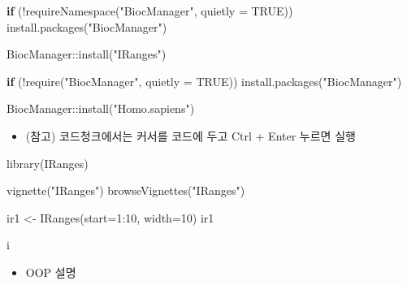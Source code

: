 \documentclass[
]{book}
\newenvironment{Shaded}{\begin{snugshade}}{\end{snugshade}}
\newcommand{\AttributeTok}[1]{\textcolor[rgb]{0.77,0.63,0.00}{#1}}
\newcommand{\ConstantTok}[1]{\textcolor[rgb]{0.00,0.00,0.00}{#1}}
\newcommand{\ControlFlowTok}[1]{\textcolor[rgb]{0.13,0.29,0.53}{\textbf{#1}}}
\newcommand{\DecValTok}[1]{\textcolor[rgb]{0.00,0.00,0.81}{#1}}
\newcommand{\FunctionTok}[1]{\textcolor[rgb]{0.00,0.00,0.00}{#1}}
\newcommand{\NormalTok}[1]{#1}
\newcommand{\OtherTok}[1]{\textcolor[rgb]{0.56,0.35,0.01}{#1}}
\newcommand{\SpecialCharTok}[1]{\textcolor[rgb]{0.00,0.00,0.00}{#1}}
\newcommand{\StringTok}[1]{\textcolor[rgb]{0.31,0.60,0.02}{#1}}
\providecommand{\tightlist}{%
  \setlength{\itemsep}{0pt}\setlength{\parskip}{0pt}}
\begin{document}
\begin{Shaded}
\begin{Highlighting}[]
\ControlFlowTok{if}\NormalTok{ (}\SpecialCharTok{!}\FunctionTok{requireNamespace}\NormalTok{(}\StringTok{"BiocManager"}\NormalTok{, }\AttributeTok{quietly =} \ConstantTok{TRUE}\NormalTok{))}
    \FunctionTok{install.packages}\NormalTok{(}\StringTok{"BiocManager"}\NormalTok{)}

\NormalTok{BiocManager}\SpecialCharTok{::}\FunctionTok{install}\NormalTok{(}\StringTok{"IRanges"}\NormalTok{)}
\end{Highlighting}
\end{Shaded}

\begin{Shaded}
\begin{Highlighting}[]
\ControlFlowTok{if}\NormalTok{ (}\SpecialCharTok{!}\FunctionTok{require}\NormalTok{(}\StringTok{"BiocManager"}\NormalTok{, }\AttributeTok{quietly =} \ConstantTok{TRUE}\NormalTok{))}
    \FunctionTok{install.packages}\NormalTok{(}\StringTok{"BiocManager"}\NormalTok{)}

\NormalTok{BiocManager}\SpecialCharTok{::}\FunctionTok{install}\NormalTok{(}\StringTok{"Homo.sapiens"}\NormalTok{)}
\end{Highlighting}
\end{Shaded}

\begin{itemize}
\tightlist
\item
  (참고) 코드청크에서는 커서를 코드에 두고 Ctrl + Enter 누르면 실행
\end{itemize}

\begin{Shaded}
\begin{Highlighting}[]
\FunctionTok{library}\NormalTok{(IRanges)}

\FunctionTok{vignette}\NormalTok{(}\StringTok{"IRanges"}\NormalTok{)}
\FunctionTok{browseVignettes}\NormalTok{(}\StringTok{"IRanges"}\NormalTok{)}

\NormalTok{ir1 }\OtherTok{\textless{}{-}} \FunctionTok{IRanges}\NormalTok{(}\AttributeTok{start=}\DecValTok{1}\SpecialCharTok{:}\DecValTok{10}\NormalTok{, }\AttributeTok{width=}\DecValTok{10}\NormalTok{)}
\NormalTok{ir1}

\NormalTok{i}
\end{Highlighting}
\end{Shaded}

\begin{itemize}
\tightlist
\item
  OOP 설명
\end{itemize}
\end{document}
